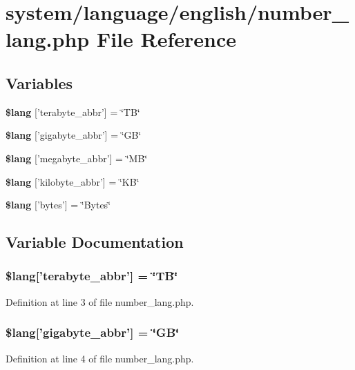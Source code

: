 \section{system/language/english/number\-\_\-lang.php File Reference}
\label{number__lang_8php}
\subsection*{Variables}
\begin{DoxyCompactItemize}
\item 
{\bf \$lang} ['terabyte\-\_\-abbr'] = \char`\"{}T\-B\char`\"{}
\item 
{\bf \$lang} ['gigabyte\-\_\-abbr'] = \char`\"{}G\-B\char`\"{}
\item 
{\bf \$lang} ['megabyte\-\_\-abbr'] = \char`\"{}M\-B\char`\"{}
\item 
{\bf \$lang} ['kilobyte\-\_\-abbr'] = \char`\"{}K\-B\char`\"{}
\item 
{\bf \$lang} ['bytes'] = \char`\"{}Bytes\char`\"{}
\end{DoxyCompactItemize}


\subsection{Variable Documentation}
\subsubsection[{\$lang}]{\setlength{\rightskip}{0pt plus 5cm}\$lang['terabyte\-\_\-abbr'] = \char`\"{}T\-B\char`\"{}}\label{number__lang_8php_a72963402ca792afbae1ba34a4050fcde}


Definition at line 3 of file number\-\_\-lang.\-php.

\subsubsection[{\$lang}]{\setlength{\rightskip}{0pt plus 5cm}\$lang['gigabyte\-\_\-abbr'] = \char`\"{}G\-B\char`\"{}}\label{number__lang_8php_a2349e7364cbc6402c44bd135b132d9d6}


Definition at line 4 of file number\-\_\-lang.\-php.

